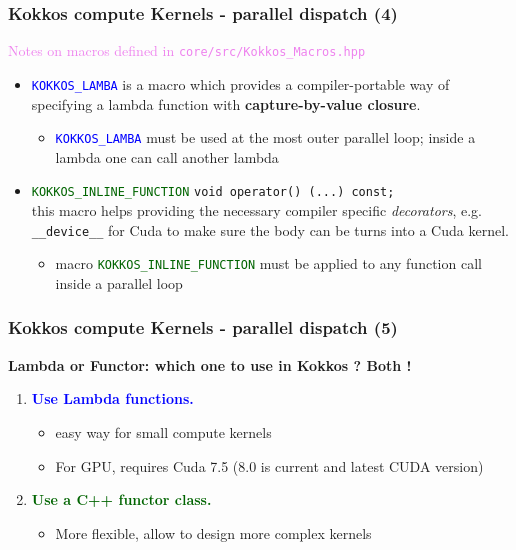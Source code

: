 \begin{frame}[fragile=singleslide]
  \frametitle{Kokkos compute Kernels - parallel dispatch (4)}

  {\Large \textcolor{violet}{Notes on macros defined in \texttt{core/src/Kokkos\_Macros.hpp}}}

  \begin{itemize}
  \item \textcolor{blue}{\texttt{KOKKOS\_LAMBA}} is a macro which provides a compiler-portable way of specifying a lambda function with \textbf{capture-by-value closure}.
    \begin{itemize}
    \item \textcolor{blue}{\texttt{KOKKOS\_LAMBA}} must be used at the most outer parallel loop; inside a lambda one can call another lambda
    \end{itemize}
  \item \textcolor{darkgreen}{\texttt{KOKKOS\_INLINE\_FUNCTION}} \texttt{void operator() (...) const;}\\
    this macro helps providing the necessary compiler specific \textit{decorators}, e.g. \texttt{\_\_device\_\_} for Cuda to make sure the body can be turns into a Cuda kernel.
    \begin{itemize}
    \item macro \textcolor{darkgreen}{\texttt{KOKKOS\_INLINE\_FUNCTION}} must be applied to any function call inside a parallel loop
    \end{itemize}
  \end{itemize}

\end{frame}

\begin{frame}[fragile=singleslide]
  \frametitle{Kokkos compute Kernels - parallel dispatch (5)}


  \textbf{Lambda or Functor: which one to use in Kokkos ? Both !}
  \begin{enumerate}
  \item \textcolor{blue}{\textbf{Use Lambda functions.}}\\
    \begin{itemize}
    \item easy way for small compute kernels
    \item For GPU, requires Cuda 7.5 (8.0 is current and latest CUDA version)
    \end{itemize}
  \item \textcolor{darkgreen}{\textbf{Use a C++ functor class.}}\\
    \begin{itemize}
    \item More flexible, allow to design more complex kernels
    \end{itemize}
  \end{enumerate}
\end{frame}


